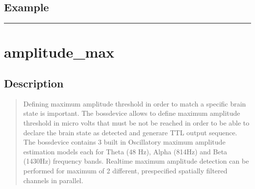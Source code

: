 \documentclass[letterpaper,10pt,english]{sphinxmanual}
\begin{document}
\subsection{Example}
\label{\detokenize{4_api_documentation:id31}}
\begin{sphinxVerbatim}[commandchars=\\\{\}]
\end{sphinxVerbatim}


\bigskip\hrule\bigskip



\section{amplitude\_max}
\label{\detokenize{4_api_documentation:amplitude-max}}

\subsection{Description}
\label{\detokenize{4_api_documentation:id32}}\begin{quote}

\sphinxAtStartPar
Defining maximum amplitude threshold in order to match a specific brain state is important. The bossdevice allows to define maximum amplitude threshold in micro volts that must be not be reached in order to be able to declare the brain state as detected and generare TTL output sequence. The bossdevice contains 3 built in Oscillatory maximum amplitude estimation models each for Theta (4\sphinxhyphen{}8 Hz), Alpha (8\sphinxhyphen{}14Hz) and Beta (14\sphinxhyphen{}30Hz) frequency bands. Real\sphinxhyphen{}time maximum amplitude detection can be performed for maximum of 2 different, pre\sphinxhyphen{}specified spatially filtered channels in parallel.
\end{quote}
\end{document}
